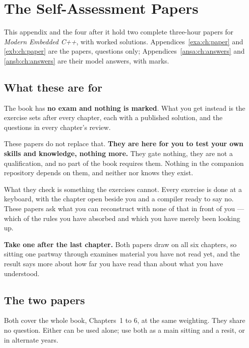 
\chapter{The Self-Assessment Papers}
\label{exam:ch:about}

This appendix and the four after it hold two complete three-hour papers for \emph{Modern Embedded
C++}, with worked solutions. Appendices~\ref{exa:ch:paper} and \ref{exb:ch:paper} are the papers,
questions only; Appendices~\ref{ansa:ch:answers} and \ref{ansb:ch:answers} are their model answers,
with marks.

\section*{What these are for}
The book has \textbf{no exam and nothing is marked}. What you get instead is the exercise sets after
every chapter, each with a published solution, and the questions in every chapter's review.

These papers do not replace that. \textbf{They are here for you to test your own skills and
knowledge, nothing more.} They gate nothing, they are not a qualification, and no part of the book
requires them. Nothing in the companion repository depends on them, and neither 
nor  knows they exist.

What they check is something the exercises cannot. Every exercise is done at a keyboard, with the
chapter open beside you and a compiler ready to say no. These papers ask what you can reconstruct
with none of that in front of you --- which of the rules you have absorbed and which you have merely
been looking up.

\textbf{Take one after the last chapter.} Both papers draw on all six chapters, so sitting one
partway through examines material you have not read yet, and the result says more about how far
you have read than about what you have understood.

\section*{The two papers}
Both cover the whole book, Chapters~1 to 6, at the same weighting. They share no question. Either
can be used alone; use both as a main sitting and a resit, or in alternate years.

